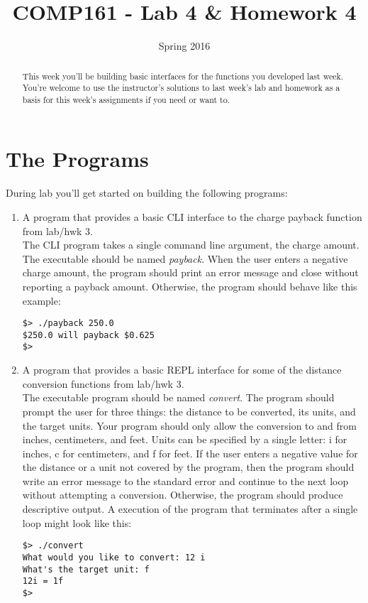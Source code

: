 \documentclass[]{tufte-handout}
\title{COMP161 - Lab 4 \& Homework 4}
\author{}
\date{Spring 2016}
\begin{document}
\maketitle
\thispagestyle{empty}

\begin{abstract}
This week you'll be building basic interfaces for the functions you developed last week. You're welcome to use the instructor's solutions to last week's lab and homework as a basis for this week's assignments if you need or want to. 
\end{abstract}

\section{The Programs}

During lab you'll get started on building the following programs:
\begin{enumerate}
\item A program that provides a basic CLI interface to the charge payback function from lab/hwk 3. \\
The CLI program takes a single command line argument, the charge amount. The executable should be named \textit{payback}. When the user enters a negative charge amount, the program should print an error message and close without reporting a payback amount. Otherwise, the program should behave like this example: 
\begin{verbatim}
$> ./payback 250.0
$250.0 will payback $0.625
$>
\end{verbatim}


\item A program that provides a basic REPL interface for some of the distance conversion functions from lab/hwk 3. \\
The executable program should be named \textit{convert}. The program should prompt the user for three things: the distance to be converted, its units, and the target units. Your program should only allow the conversion to and from inches, centimeters, and feet. Units can be specified by a single letter: i for inches, c for centimeters, and f for feet. If the user enters a negative value for the distance or a unit not covered by the program, then the program should write an error message to the standard error and continue to the next loop without attempting a conversion. Otherwise, the program should produce descriptive output. A execution of the program that terminates after a single loop might look like this:
\begin{verbatim}
$> ./convert
What would you like to convert: 12 i
What's the target unit: f
12i = 1f
$>
\end{verbatim}
\end{enumerate}
\end{document}
